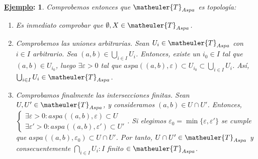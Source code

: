 \documentclass[10pt,a4paper,openright]{book}
\theoremstyle{break}
\newtheorem*{ej}{\underline{Ejemplo}:}
\begin{document}
\begin{ej}
Comprobemos entonces que $\matheuler{T}_{Aspa}$ es topología:
\begin{enumerate}[label={(\arabic*)}]
\item Es inmediato comprobar que $\emptyset, X \in \matheuler{T}_{Aspa}$.
\item Comprobemos las uniones arbitrarias. Sean $U_i \in \matheuler{T}_{Aspa}$ con $i \in I$ arbitrario. Sea $(a,b) \in \bigcup_{i \in I} U_i$. Entonces, existe un $i_0 \in I$ tal que $(a,b) \in U_{i_0}$, luego $\exists \varepsilon > 0$ tal que $aspa((a,b), \varepsilon) \subset U_{i_0} \subset \bigcup_{i \in I} U_i$. Así, $\bigcup_{i \in I} U_i \in \matheuler{T}_{Aspa}$.
\item Comprobamos finalmente las intersecciones finitas. Sean $U, U' \in \matheuler{T}_{Aspa}$, y consideramos $(a,b) \in U \cap U'$. Entonces, $\begin{cases} \exists \varepsilon > 0 : aspa((a,b), \varepsilon) \subset U \\ \exists \varepsilon' > 0 : aspa((a,b), \varepsilon') \subset U' \end{cases}$. Si elegimos $\varepsilon_0 = \min \{\varepsilon, \varepsilon'\}$ se cumple que $aspa((a,b), \varepsilon_0) \subset U \cap U'$. Por tanto, $U \cap U' \in \matheuler{T}_{Aspa}$ y consecuentemente $\bigcap_{i \in I} U_i : I$ finito $\in \matheuler{T}_{Aspa}$.
\end{enumerate}
\end{ej}
\end{document}
